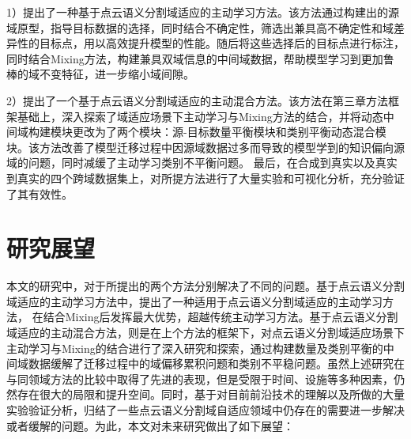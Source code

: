 

1）提出了一种基于点云语义分割域适应的主动学习方法。该方法通过构建出的源域原型，指导目标数据的选择，同时结合不确定性，筛选出兼具高不确定性和域差异性的目标点，用以高效提升模型的性能。随后将这些选择后的目标点进行标注，同时结合Mixing方法，构建兼具双域信息的中间域数据，帮助模型学习到更加鲁棒的域不变特征，进一步缩小域间隙。%

2）提出了一个基于点云语义分割域适应的主动混合方法。该方法在第三章方法框架基础上，深入探索了域适应场景下主动学习与Mixing方法的结合，并将动态中间域构建模块更改为了两个模块：源-目标数量平衡模块和类别平衡动态混合模块。该方法改善了模型迁移过程中因源域数据过多而导致的模型学到的知识偏向源域的问题，同时减缓了主动学习类别不平衡问题。
最后，在合成到真实以及真实到真实的四个跨域数据集上，对所提方法进行了大量实验和可视化分析，充分验证了其有效性。

\section{研究展望}
本文的研究中，对于所提出的两个方法分别解决了不同的问题。基于点云语义分割域适应的主动学习方法中，提出了一种适用于点云语义分割域适应的主动学习方法，
在结合Mixing后发挥最大优势，超越传统主动学习方法。基于点云语义分割域适应的主动混合方法，则是在上个方法的框架下，对点云语义分割域适应场景下主动学习与Mixing的结合进行了深入研究和探索，通过构建数量及类别平衡的中间域数据缓解了迁移过程中的域偏移累积问题和类别不平稳问题。虽然上述研究在与同领域方法的比较中取得了先进的表现，但是受限于时间、设施等多种因素，仍然存在很大的局限和提升空间。同时，基于对目前前沿技术的理解以及所做的大量实验验证分析，归结了一些点云语义分割域自适应领域中仍存在的需要进一步解决或者缓解的问题。为此，本文对未来研究做出了如下展望：

